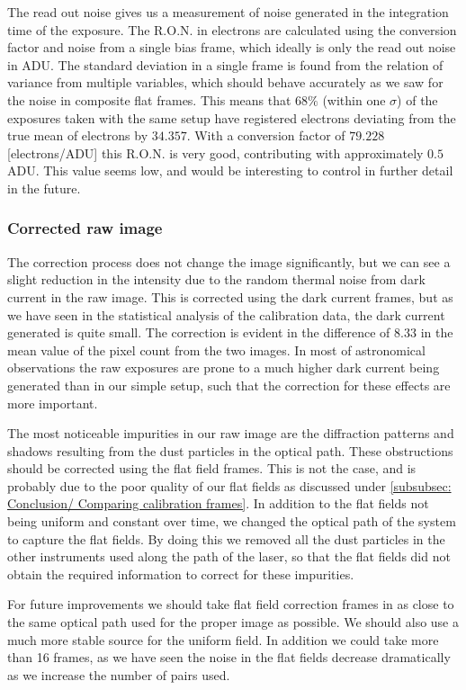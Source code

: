 \documentclass{emulateapj}
\begin{document}
The read out noise gives us a measurement of noise generated in the integration time of the exposure. The R.O.N. in electrons are calculated using the conversion factor and noise from a single bias frame, which ideally is only the read out noise in ADU. The standard deviation in a single frame is found from the relation of variance from multiple variables, which should behave accurately as we saw for the noise in composite flat frames.  This means that $68\%$ (within one $\sigma$) of the exposures taken with the same setup have registered electrons deviating from the true mean of electrons by $34.357$. With a conversion factor of $79.228$ [electrons/ADU] this R.O.N. is very good, contributing with approximately $0.5$ ADU. This value seems low, and would be interesting to control in further detail in the future.\bigskip \bigskip

\subsubsection{Corrected raw image}
The correction process does not change the image significantly, but we can see a slight reduction in the intensity due to the random thermal noise from dark current in the raw image. This is corrected using the dark current frames, but as we have seen in the statistical analysis of the calibration data, the dark current generated is quite small. The correction is evident in the difference of $8.33$ in the mean value of the pixel count from the two images. In most of astronomical observations the raw exposures are prone to a much higher dark current being generated than in our simple setup, such that the correction for these effects are more important.

The most noticeable impurities in our raw image are the diffraction patterns and shadows resulting from the dust particles in the optical path. These obstructions should be corrected using the flat field frames. This is not the case, and is probably due to the poor quality of our flat fields as discussed under \cref{subsubsec: Conclusion/ Comparing calibration frames}. In addition to the flat fields not being uniform and constant over time, we changed the optical path of the system to capture the flat fields. By doing this we removed all the dust particles in the other instruments used along the path of the laser, so that the flat fields did not obtain the required information to correct for these impurities.

For future improvements we should take flat field correction frames in as close to the same optical path used for the proper image as possible. We should also use a much more stable source for the uniform field. In addition we could take more than 16 frames, as we have seen the noise in the flat fields decrease dramatically as we increase the number of pairs used.
\medskip
\end{document}

